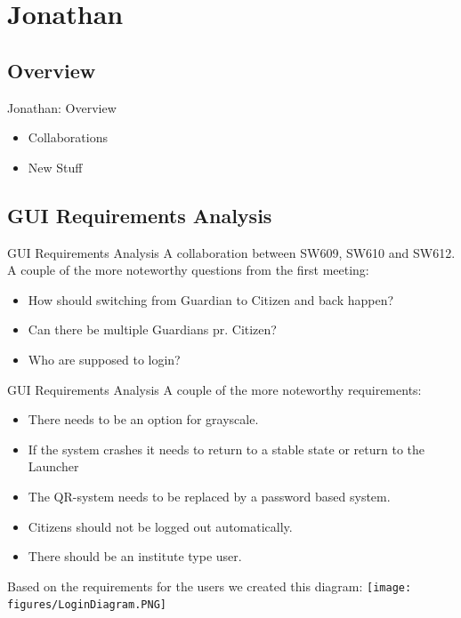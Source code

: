 \section{Jonathan}
\subsection{Overview}
\begin{frame}{Jonathan: Overview}
\begin{itemize}
\item Collaborations
\item New Stuff
\end{itemize}
\end{frame}

\subsection{GUI Requirements Analysis}
\begin{frame}{GUI Requirements Analysis}
A collaboration between SW609, SW610 and SW612.\\

A couple of the more noteworthy questions from the first meeting:
\begin{itemize}
\item How should switching from Guardian to Citizen and back happen?
\item Can there be multiple Guardians pr. Citizen?
\item Who are supposed to login?
\end{itemize}

\end{frame}

\begin{frame}[fragile]{GUI Requirements Analysis}
A couple of the more noteworthy requirements:

\begin{itemize}
\item There needs to be an option for grayscale.
\item If the system crashes it needs to return to a stable state or return to the Launcher
\item The QR-system needs to be replaced by a password based system.
\item Citizens should not be logged out automatically.
\item There should be an institute type user.
\end{itemize}

Based on the requirements for the users we created this diagram:
\texttt{[image: figures/LoginDiagram.PNG]}
\end{frame}

